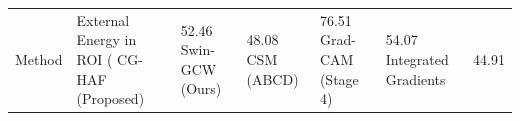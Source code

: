 \begin{tabular}{lllll}
\toprule
Method & External Energy in ROI (%
\midrule
CG-HAF (Proposed) & 52.46%
Swin-GCW (Ours) & 48.08%
CSM (ABCD) & 76.51%
Grad-CAM (Stage 4) & 54.07%
Integrated Gradients & 44.91%
\bottomrule
\end{tabular}

